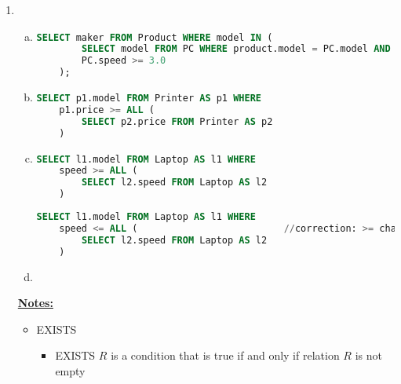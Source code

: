 \documentclass[12pt]{article}
\begin{document}
\begin{enumerate}[1.]
\begin{enumerate}[a)]
    \end{enumerate}

    \item

    \begin{enumerate}[a)]
        \item

    \begin{lstlisting}[language=SQL]
    SELECT maker FROM Product WHERE model IN (
        SELECT model FROM PC WHERE product.model = PC.model AND
        PC.speed >= 3.0
    );
    \end{lstlisting}


        \item

    \begin{lstlisting}[language=SQL]
    SELECT p1.model FROM Printer AS p1 WHERE
    p1.price >= ALL (
        SELECT p2.price FROM Printer AS p2
    )
    \end{lstlisting}

        \item

    \begin{lstlisting}[language=SQL]
    SELECT l1.model FROM Laptop AS l1 WHERE
    speed >= ALL (
        SELECT l2.speed FROM Laptop AS l2
    )
    \end{lstlisting}

        \begin{mdframed}

    \begin{lstlisting}[language=SQL]
    SELECT l1.model FROM Laptop AS l1 WHERE
    speed <= ALL (                          //correction: >= changed to <=
        SELECT l2.speed FROM Laptop AS l2
    )
    \end{lstlisting}

        \end{mdframed}

        \item



    \end{enumerate}

    \underline{\textbf{Notes:}}

    \bigskip

    \begin{itemize}
        \item EXISTS
        \begin{itemize}
            \item EXISTS $R$ is a condition that is true if and only if relation $R$ is not empty


\end{itemize}
\end{itemize}
\end{enumerate}
\end{document}
